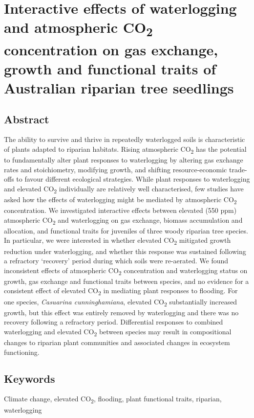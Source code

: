 \documentclass[12pt,a4paper]{memoir}
\begin{document}
\onehalfspacing


\chapter[glasshouse]{Interactive effects of waterlogging and atmospheric CO\textsubscript{2} concentration on gas exchange, growth and functional traits of Australian riparian tree seedlings}
\newpage

\section*{Abstract}
The ability to survive and thrive in repeatedly waterlogged soils is characteristic of plants adapted to riparian habitats. Rising atmospheric CO\textsubscript{2} has the potential to fundamentally alter plant responses to waterlogging by altering gas exchange rates and stoichiometry, modifying growth, and shifting resource-economic trade-offs to favour different ecological strategies. While plant responses to waterlogging and elevated CO\textsubscript{2} individually are relatively well characterised, few studies have asked how the effects of waterlogging might be mediated by atmospheric CO\textsubscript{2} concentration. We investigated interactive effects between elevated (550 ppm) atmospheric CO\textsubscript{2} and waterlogging on gas exchange, biomass accumulation and allocation, and functional traits for juveniles of three woody riparian tree species. In particular, we were interested in whether elevated CO\textsubscript{2} mitigated growth reduction under waterlogging, and whether this response was sustained following a refractory ‘recovery’ period during which soils were re-aerated. We found inconsistent effects of atmospheric CO\textsubscript{2} concentration and waterlogging status on growth, gas exchange and functional traits between species, and no evidence for a consistent effect of elevated CO\textsubscript{2} in mediating plant responses to flooding. For one species, \textit{Casuarina cunninghamiana}, elevated CO\textsubscript{2} substantially increased growth, but this effect was entirely removed by waterlogging and there was no recovery following a refractory period. Differential responses to combined waterlogging and elevated CO\textsubscript{2} between species may result in compositional changes to riparian plant communities and associated changes in ecosystem functioning.

\section*{Keywords}
Climate change, elevated CO\textsubscript{2}, flooding, plant functional traits, riparian, waterlogging
\end{document}
